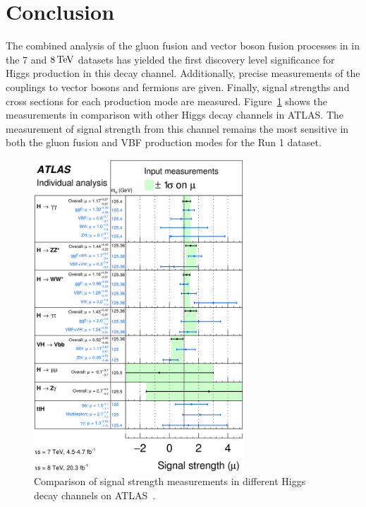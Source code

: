 \section{Conclusion}

The combined analysis of the gluon fusion and vector boson fusion processes in \HWWfull in the $7$ and $8 \TeV$ datasets has yielded the first discovery level significance for Higgs production in this decay channel. Additionally, precise measurements of the couplings to vector bosons and fermions are given. Finally, signal strengths and cross sections for each production mode are measured. Figure~\ref{fig:mu_summary} shows the \HWWfull measurements in comparison with other Higgs decay channels in ATLAS. The measurement of signal strength from this channel remains the most sensitive in both the gluon fusion and VBF production modes for the Run 1 dataset. 

\begin{figure}[h!]
  \centering
  \captionsetup{justification=centering}

  \includegraphics[width=0.7\textwidth]{figures/mu_summary}
  \caption{Comparison of signal strength measurements in different Higgs decay channels on ATLAS~\cite{HiggsSummaryRun1}.}
  \label{fig:mu_summary}
\end{figure}


